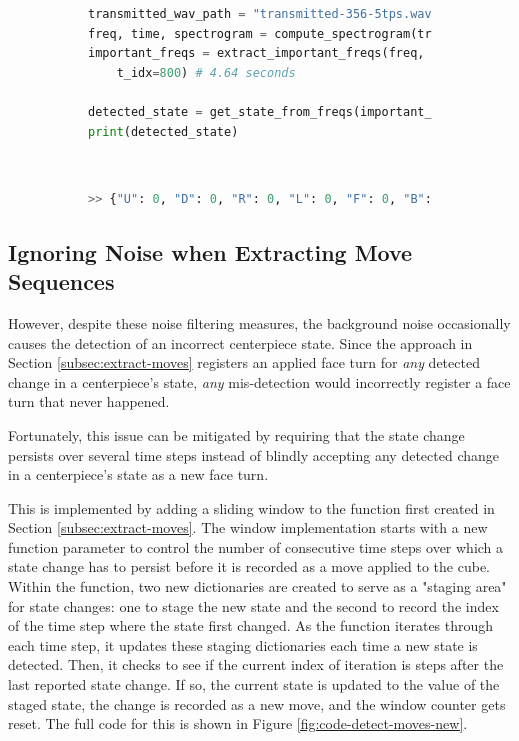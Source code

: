\begin{figure}[h]
\caption{Example: Refined conversion of peak frequencies to states}
\label{fig:code-get-state-from-freqs-new-demo}
\begin{subfigure}{\textwidth}
\begin{lstlisting}[language=Python]
transmitted_wav_path = "transmitted-356-5tps.wav"
freq, time, spectrogram = compute_spectrogram(transmitted_wav_path)
important_freqs = extract_important_freqs(freq, time, spectrogram,
    t_idx=800) # 4.64 seconds

detected_state = get_state_from_freqs(important_freqs)
print(detected_state)
\end{lstlisting}
\end{subfigure}\\

\begin{subfigure}{\textwidth}
\begin{lstlisting}[language=Python, numbers=none]
>> {"U": 0, "D": 0, "R": 0, "L": 0, "F": 0, "B": 0}
\end{lstlisting}
\end{subfigure}
\end{figure}

\newpage
\subsection{Ignoring Noise when Extracting Move Sequences}
\label{subsec:ignoring-noise-when-extracting-move-sequences}
However, despite these noise filtering measures, the background noise occasionally causes the detection of an incorrect centerpiece state.
Since the approach in Section \ref{subsec:extract-moves} registers an applied face turn for \emph{any} detected change in a centerpiece's state, \emph{any} mis-detection would incorrectly register a face turn that never happened.

Fortunately, this issue can be mitigated by requiring that the state change persists over several time steps instead of blindly accepting any detected change in a centerpiece's state as a new face turn.

This is implemented by adding a sliding window to the  function first created in Section \ref{subsec:extract-moves}.
The window implementation starts with a new  function parameter to control the number of consecutive time steps over which a state change has to persist before it is recorded as a move applied to the cube.
Within the function, two new dictionaries are created to serve as a "staging area" for state changes: one to stage the new state and the second to record the index of the time step where the state first changed.
As the function iterates through each time step, it updates these staging dictionaries each time a new state is detected.
Then, it checks to see if the current index of iteration is  steps after the last reported state change.
If so, the current state is updated to the value of the staged state, the change is recorded as a new move, and the window counter gets reset.
The full code for this is shown in Figure \ref{fig:code-detect-moves-new}.



